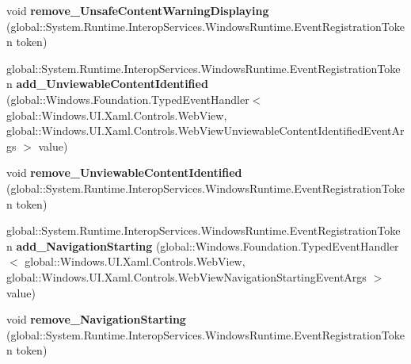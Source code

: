 \begin{DoxyCompactItemize}
\item 
\mbox{\label{interface_windows_1_1_u_i_1_1_xaml_1_1_controls_1_1_i_web_view2_a3eb3a06e24cf2bd12de883bf81fb40d7}} 
void {\bfseries remove\+\_\+\+Unsafe\+Content\+Warning\+Displaying} (global\+::\+System.\+Runtime.\+Interop\+Services.\+Windows\+Runtime.\+Event\+Registration\+Token token)
\item 
\mbox{\label{interface_windows_1_1_u_i_1_1_xaml_1_1_controls_1_1_i_web_view2_a638c2029f3df84d7780aad5ec3492315}} 
global\+::\+System.\+Runtime.\+Interop\+Services.\+Windows\+Runtime.\+Event\+Registration\+Token {\bfseries add\+\_\+\+Unviewable\+Content\+Identified} (global\+::\+Windows.\+Foundation.\+Typed\+Event\+Handler$<$ global\+::\+Windows.\+U\+I.\+Xaml.\+Controls.\+Web\+View, global\+::\+Windows.\+U\+I.\+Xaml.\+Controls.\+Web\+View\+Unviewable\+Content\+Identified\+Event\+Args $>$ value)
\item 
\mbox{\label{interface_windows_1_1_u_i_1_1_xaml_1_1_controls_1_1_i_web_view2_a2882acdd93078aca17a084dda51aa7a7}} 
void {\bfseries remove\+\_\+\+Unviewable\+Content\+Identified} (global\+::\+System.\+Runtime.\+Interop\+Services.\+Windows\+Runtime.\+Event\+Registration\+Token token)
\item 
\mbox{\label{interface_windows_1_1_u_i_1_1_xaml_1_1_controls_1_1_i_web_view2_a23045b54a3bab5196d47fc172fd18d87}} 
global\+::\+System.\+Runtime.\+Interop\+Services.\+Windows\+Runtime.\+Event\+Registration\+Token {\bfseries add\+\_\+\+Navigation\+Starting} (global\+::\+Windows.\+Foundation.\+Typed\+Event\+Handler$<$ global\+::\+Windows.\+U\+I.\+Xaml.\+Controls.\+Web\+View, global\+::\+Windows.\+U\+I.\+Xaml.\+Controls.\+Web\+View\+Navigation\+Starting\+Event\+Args $>$ value)
\item 
\mbox{\label{interface_windows_1_1_u_i_1_1_xaml_1_1_controls_1_1_i_web_view2_a669f35cd29b2d8961a6c132444a73ddf}} 
void {\bfseries remove\+\_\+\+Navigation\+Starting} (global\+::\+System.\+Runtime.\+Interop\+Services.\+Windows\+Runtime.\+Event\+Registration\+Token token)

\end{DoxyCompactItemize}
